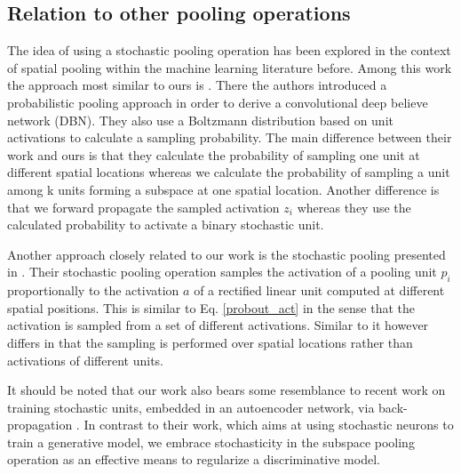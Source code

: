 \documentclass{article} \pdfoutput=1
\begin{document}
\subsection{Relation to other pooling operations}
The idea of using a stochastic pooling operation has been explored in
the context of spatial pooling within the machine learning literature
before. Among this work the approach most similar to ours is
\cite{Lee2009}. There the authors introduced a probabilistic
pooling approach in order to derive a convolutional deep believe
network (DBN). They also use a Boltzmann distribution based on unit
activations to calculate a sampling probability. The main difference
between their work and ours is that they calculate the probability of
sampling one unit at different spatial locations whereas we calculate
the probability of sampling a unit among k units forming a subspace at
one spatial location.
Another difference is that we forward propagate the sampled activation
$z_i$ whereas they use the calculated probability to activate a binary
stochastic unit.

Another approach closely related to our work is the stochastic pooling
presented in \cite{ZeilerStochastic2013}. Their stochastic pooling
operation samples the activation of a pooling unit $p_i$
proportionally to the activation $a$ of a rectified linear unit
\cite{Nair2010} computed at different spatial positions. This is
similar to Eq. \eqref{probout_act} in the sense that the activation is
sampled from a set of different activations. Similar to
\cite{Lee2009} it however differs in that the sampling is
performed over spatial locations rather than activations of different
units.

It should be noted that our work also bears some resemblance to recent
work on training stochastic units, embedded in an autoencoder network,
via back-propagation \cite{BengioStochastic2013,BengioGSN2013}. In contrast
to their work, which aims at using stochastic neurons to train a
generative model, we embrace stochasticity in the subspace pooling
operation as an effective means to regularize a discriminative
model.
\end{document}
